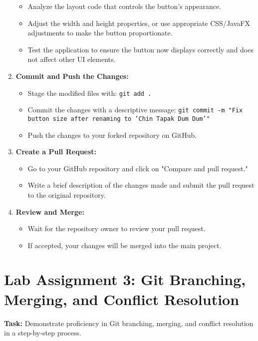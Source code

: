 \documentclass[a4paper,12pt]{report}
\begin{document}
\begin{enumerate}[label=\arabic*.]
    \begin{itemize}
        \item Analyze the layout code that controls the button's appearance.
        \item Adjust the width and height properties, or use appropriate CSS/JavaFX adjustments to make the button proportionate.
        \item Test the application to ensure the button now displays correctly and does not affect other UI elements.
    \end{itemize}
    \item \textbf{Commit and Push the Changes:}
    \begin{itemize}
        \item Stage the modified files with: \texttt{git add .}
        \item Commit the changes with a descriptive message: \texttt{git commit -m "Fix button size after renaming to 'Chin Tapak Dum Dum'"}
        \item Push the changes to your forked repository on GitHub.
    \end{itemize}
    \item \textbf{Create a Pull Request:}
    \begin{itemize}
        \item Go to your GitHub repository and click on "Compare and pull request."
        \item Write a brief description of the changes made and submit the pull request to the original repository.
    \end{itemize}
    \item \textbf{Review and Merge:}
    \begin{itemize}
        \item Wait for the repository owner to review your pull request.
        \item If accepted, your changes will be merged into the main project.
    \end{itemize}
\end{enumerate}
\section{Lab Assignment 3: Git Branching, Merging, and Conflict Resolution}

\textbf{Task:} Demonstrate proficiency in Git branching, merging, and conflict resolution in a step-by-step process.
\end{document}
